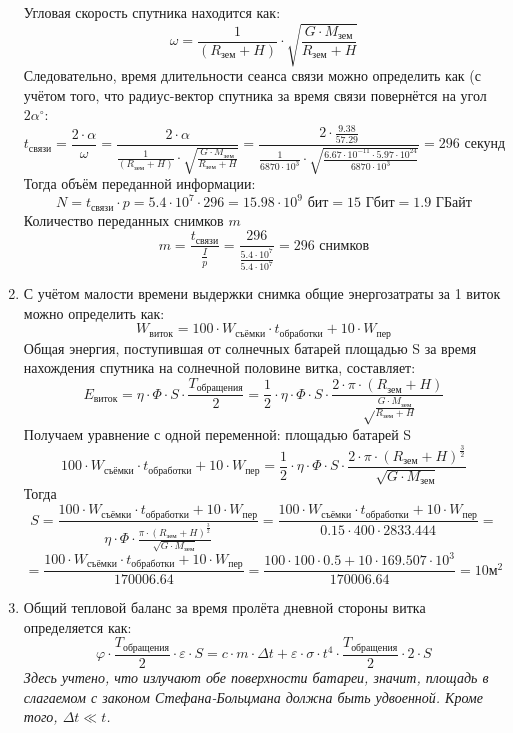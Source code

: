 \begin{enumerate}
    Угловая скорость спутника находится как:
    $$\omega=\frac{1}{(R_\text{зем}+H)}\cdot\sqrt{\frac{G\cdot M_\text{зем}}{R_\text{зем}+H}}$$
    Следовательно, время длительности сеанса связи можно определить как (с учётом того, что радиус-вектор спутника за время связи повернётся на угол $2\alpha^\circ$:
    $$t_\text{связи}=\frac{2\cdot\alpha}{\omega}=\frac{2\cdot\alpha}{\frac{1}{(R_\text{зем}+H)}\cdot\sqrt{\frac{G\cdot M_\text{зем}}{R_\text{зем}+H}}}=\frac{2\cdot\frac{9.38}{57.29}}{\frac{1}{6870\cdot10^3}\cdot\sqrt{\frac{6.67\cdot10^{-11}\cdot5.97\cdot10^{24}}{6870\cdot10^3}}}=296\text{ секунд}$$
    Тогда объём переданной информации:
    $$N=t_\text{связи}\cdot p=5.4\cdot10^7\cdot296=15.98\cdot10^9\text{ бит}=15\text{ Гбит}=1.9\text{ ГБайт}$$
    Количество переданных снимков $m$
    $$m=\frac{t_\text{связи}}{\frac{I}{p}}=\frac{296}{\frac{5.4\cdot10^7}{5.4\cdot10^7}}=296\text{ снимков}$$
    \item С учётом малости времени выдержки снимка общие энергозатраты за 1 виток можно определить как:
    $$W_\text{виток}=100\cdot W_\text{съёмки}\cdot t_\text{обработки}+10\cdot W_\text{пер}$$
    Общая энергия, поступившая от солнечных батарей площадью S за время нахождения спутника на солнечной половине витка, составляет:
    $$E_\text{виток}=\eta\cdot\Phi\cdot S\cdot \frac{T_\text{обращения}}{2}=\frac{1}{2}\cdot\eta\cdot\Phi\cdot S\cdot\frac{2\cdot\pi\cdot(R_\text{зем}+H)}{\sqrt\frac{G\cdot M_\text{зем}}{R_\text{зем}+H}}$$
    Получаем уравнение с одной переменной: площадью батарей S 
    $$100\cdot W_\text{съёмки}\cdot t_\text{обработки}+10\cdot W_\text{пер}=\frac{1}{2}\cdot\eta\cdot\Phi\cdot S\cdot\frac{2\cdot\pi\cdot(R_\text{зем}+H)^{\frac{3}{2}}}{\sqrt{G\cdot M_\text{зем}}}$$
    Тогда
    $$S=\frac{100\cdot W_\text{съёмки}\cdot t_\text{обработки}+10\cdot W_\text{пер}}{\eta\cdot\Phi\cdot\frac{\pi\cdot(R_\text{зем}+H)^{\frac{3}{2}}}{\sqrt{G\cdot M_\text{зем}}}}=\frac{100\cdot W_\text{съёмки}\cdot t_\text{обработки}+10\cdot W_\text{пер}}{0.15\cdot 400\cdot 2833.444}=$$
    $$=\frac{100\cdot W_\text{съёмки}\cdot t_\text{обработки}+10\cdot W_\text{пер}}{170006.64}=\frac{100\cdot 100\cdot 0.5+10\cdot 169.507\cdot 10^3}{170006.64}=10\text{м}^2$$
    \item Общий тепловой баланс за время пролёта дневной стороны витка определяется как:
    $$\varphi\cdot\frac{T_\text{обращения}}{2}\cdot\varepsilon\cdot S=c\cdot m\cdot\Delta t+\varepsilon\cdot\sigma\cdot t^4\cdot\frac{T_\text{обращения}}{2}\cdot2\cdot S$$
    \textit {Здесь учтено, что излучают обе поверхности батареи, значит, площадь в слагаемом с законом Стефана-Больцмана должна быть удвоенной. Кроме того, $\Delta t\ll t$.}

\end{enumerate}
